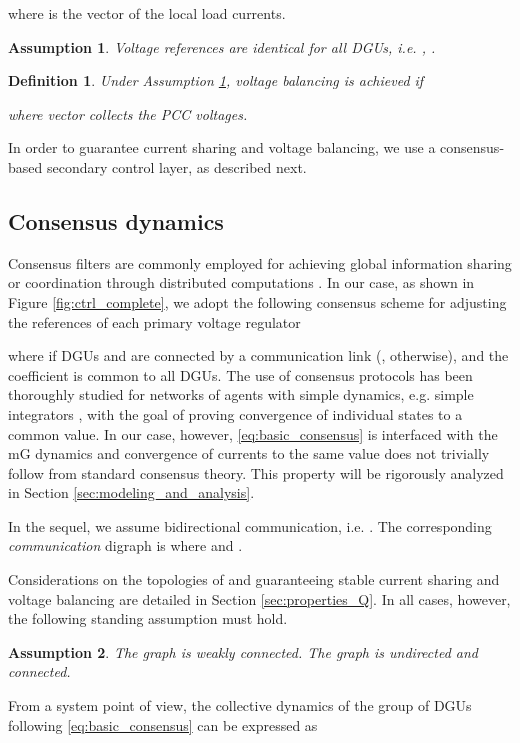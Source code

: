 \documentclass[a4paper]{article}
\theoremstyle{plain}
\newtheorem{ass}{Assumption}
\newtheorem{definition}{Definition}
\begin{document}
where  is the vector of the local load currents.

\begin{ass}
	\label{ass:vref}
	Voltage references are identical for all DGUs, i.e. , .
\end{ass}
\begin{definition}
	\label{defn:vb}
	Under Assumption \ref{ass:vref}, \textit{voltage balancing} is achieved if 
	
	where vector  collects the PCC voltages.
\end{definition}

In order to guarantee current sharing and voltage balancing, we use a consensus-based secondary
control layer, as described next. 
\subsection{Consensus dynamics}
Consensus filters are commonly employed for achieving
global information sharing or coordination through distributed
computations \cite{olfati2004consensus,lns-v.85}. In our case, as
shown in Figure \ref{fig:ctrl_complete}, we adopt the following
consensus scheme for adjusting the references of each primary voltage regulator

where  if DGUs  and  are connected by a communication
link (, otherwise), and the coefficient  is
common to all DGUs. The use of consensus protocols has been thoroughly
studied for networks of agents with simple dynamics, e.g. simple
integrators \cite{olfati2004consensus,lns-v.85}, with the goal of
proving convergence of individual states to a common value. In our
case, however, \eqref{eq:basic_consensus} is interfaced with the mG dynamics and convergence
of currents  to the same value does not trivially follow from
standard consensus theory. This property will be rigorously analyzed in Section
\ref{sec:modeling_and_analysis}. 

In the sequel, we assume bidirectional communication, i.e. . The corresponding \textit{communication} digraph is
 where
 and . 

Considerations on the topologies of  and  guaranteeing stable current sharing and voltage balancing are detailed in Section \ref{sec:properties_Q}. In all cases, however, the following standing assumption must hold.
\begin{ass}
	\label{ass:conneced}
The graph  is weakly
		connected. The graph  is undirected and connected.
\end{ass}
From a system point of view, the collective dynamics of the group of DGUs
following \eqref{eq:basic_consensus} can be expressed as
\end{document}
